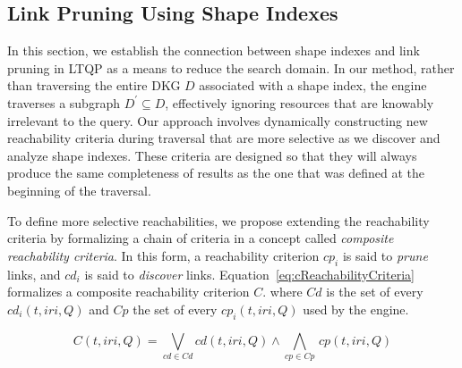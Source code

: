 \subsection{Link Pruning Using Shape Indexes}\label{sec:sourceSelection}

In this section, we establish the connection between shape indexes and link pruning in LTQP as a means to reduce the search domain.
In our method, rather than traversing the entire DKG $D$ associated with a shape index, the engine traverses a subgraph $D^{\prime} \subseteq D$, effectively ignoring resources that are knowably irrelevant to the query.
Our approach involves dynamically constructing new reachability criteria during traversal that are more selective as we discover and analyze shape indexes.
These criteria are designed so that they will always produce the same completeness of results as the one that was defined at the beginning of the traversal.

To define more selective reachabilities, we propose extending the reachability criteria by formalizing a chain of criteria in a concept called \emph{composite reachability criteria}.
In this form, a reachability criterion $cp_i$ is said to \emph{prune} links, and $cd_i$ is said to \emph{discover} links.
Equation~\ref{eq:cReachabilityCriteria} formalizes a composite reachability criterion $C$.
where $Cd$ is the set of every $cd_i(t, iri, Q)$ and $Cp$ the set of every $cp_i(t, iri, Q)$ used by the engine.

\begin{equation}\label{eq:cReachabilityCriteria}
   C(t, iri, Q) = \bigvee_{cd \in Cd} cd(t, iri, Q) \mathrel{\land} \bigwedge_{cp \in Cp} \, cp(t, iri, Q)
\end{equation}

